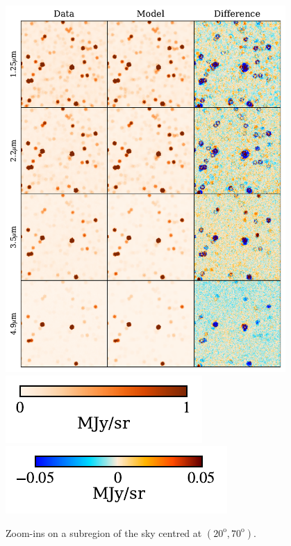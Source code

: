 \documentclass{aa}
\begin{document}
\begin{figure}
  \includegraphics[width=0.95\textwidth]{figs/zoom/combined_zoom.pdf}\\
  \vspace{-8pt}
  \hspace{1.5in}
  \includegraphics[scale=1]{figs/zoom/cbar1.pdf}
  \hspace{1.1in}
  \includegraphics[scale=1]{figs/zoom/cbar2.pdf}
  \caption{Zoom-ins on a subregion of the sky centred at $(20^\mathrm{o},70^\mathrm{o})$. }
  \label{fig:zooms}
\end{figure}
\end{document}
